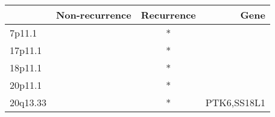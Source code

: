\begin{tabular}{lccr}
\toprule
{} & Non-recurrence & Recurrence &         Gene \\
\midrule
7p11.1   &                &          * &              \\
17p11.1  &                &          * &              \\
18p11.1  &                &          * &              \\
20p11.1  &                &          * &              \\
20q13.33 &                &          * &  PTK6,SS18L1 \\
\bottomrule
\end{tabular}
